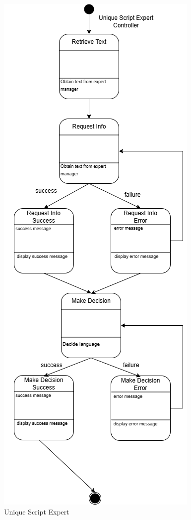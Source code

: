 \begin{figure}[H]
	\centering
	\includegraphics[width=\textwidth, height=\textheight, keepaspectratio]{Section2/images/unique_script_expert_state_diagram.png}
	\caption{Unique Script Expert}
	\label{UniqueScriptExpert}
\end{figure}
